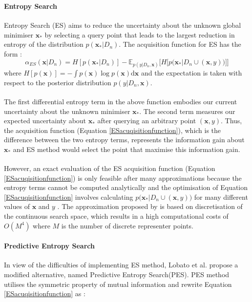 \documentclass[a4paper,11pt]{report}
\begin{document}
\textbf{Entropy Search}
\\\\
Entropy Search (ES) \cite{hennig2012entropy} aims to reduce the uncertainty about the unknown global minimiser $\mathbf{x}_*$ by selecting a query point that leads to the largest reduction in entropy of the distribution $p(\mathbf{x}_* \vert D_n)$. The acquisition function for ES has the form \cite{hennig2012entropy}: 
\begin{equation} \label{ESacuqisitionfunction}
	\alpha_{ES} (\mathbf{x} \vert D_n )=H[p(\mathbf{x}_{*} \vert D_n)]-\mathbb{E} _{p(y \vert D_n,\mathbf{x})} \Big[H \big[p \big( \mathbf{x}_{*} \vert D_n \cup {(\mathbf{x},y)} \big) \big] \Big] 
\end{equation}
where $H[p(\mathbf{x})] = - \int p(\mathbf{x}) \log p(\mathbf{x}) \mathrm{d} \mathbf{x} $ and the expectation is taken with respect to the posterior distribution $p(y \vert D_n,\mathbf{x}) $. 
\\\\
The first differential entropy term in the above function embodies our current uncertainty about the unknown minimiser $\mathbf{x}_*$. The second term measures our expected uncertainty about $\mathbf{x}_*$ after querying an arbitrary point $(\mathbf{x},y)$. Thus, the acquisition function (Equation \ref{ESacuqisitionfunction}), which is the difference between the two entropy terms, represents the information gain about  $\mathbf{x}_*$ and ES method would select the point that maximise this information gain.
\\\\
However, an exact evaluation of the ES acquisition function (Equation \ref{ESacuqisitionfunction}) is only feasible after many approximations because the entropy terms cannot be computed analytically and the optimisation of Equation \ref{ESacuqisitionfunction} involves calculating $p \big(\mathbf{x}_{*} \vert D_n \cup {(\mathbf{x},y)} \big)$ for many different values of $\mathbf{x}$ and $y$ \cite{hernandez2014predictive}. The approximation proposed by \cite{hennig2012entropy} is based on discretisation of the continuous search space, which results in a high computational costs of $O(M^4)$ where $ M $ is the number of discrete representer points. 
\\\\
\textbf{Predictive Entropy Search}
\\\\
In view of the difficulties of implementing ES method, Lobato et al.\cite{hernandez2014predictive} propose a modified alternative,  named Predictive Entropy Search(PES). PES method utilises the symmetric property of mutual information and rewrite Equation \ref{ESacuqisitionfunction} as \cite{hernandez2014predictive} : 
\end{document}
